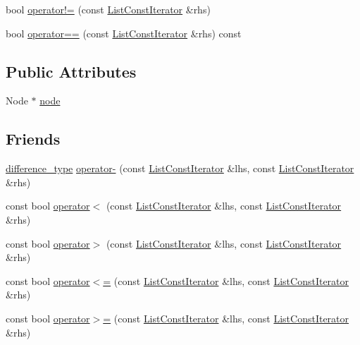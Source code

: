 \begin{DoxyCompactItemize}
\item 
bool \hyperlink{structprism_1_1containers_1_1_list_const_iterator_a16a8c6644cbdedc5173c5a02971379a0}{operator!=} (const \hyperlink{structprism_1_1containers_1_1_list_const_iterator}{List\+Const\+Iterator} \&rhs)
\item 
bool \hyperlink{structprism_1_1containers_1_1_list_const_iterator_a1e424bc437a30ed8895fca8c4dd9934d}{operator==} (const \hyperlink{structprism_1_1containers_1_1_list_const_iterator}{List\+Const\+Iterator} \&rhs) const 
\end{DoxyCompactItemize}
\subsection*{Public Attributes}
\begin{DoxyCompactItemize}
\item 
Node $\ast$ \hyperlink{structprism_1_1containers_1_1_list_const_iterator_ab430437e0a8fb4c69e208a2033c3ac3d}{node}
\end{DoxyCompactItemize}
\subsection*{Friends}
\begin{DoxyCompactItemize}
\item 
\hyperlink{structprism_1_1containers_1_1_list_const_iterator_a64a29291c0139f4087a7c79690ed1e9e}{difference\+\_\+type} \hyperlink{structprism_1_1containers_1_1_list_const_iterator_af2aaffc284b1e7cfc6cd27ca7f6a04cb}{operator-\/} (const \hyperlink{structprism_1_1containers_1_1_list_const_iterator}{List\+Const\+Iterator} \&lhs, const \hyperlink{structprism_1_1containers_1_1_list_const_iterator}{List\+Const\+Iterator} \&rhs)
\item 
const bool \hyperlink{structprism_1_1containers_1_1_list_const_iterator_a06e7f8ea77c503503dca203a503a7c6d}{operator$<$} (const \hyperlink{structprism_1_1containers_1_1_list_const_iterator}{List\+Const\+Iterator} \&lhs, const \hyperlink{structprism_1_1containers_1_1_list_const_iterator}{List\+Const\+Iterator} \&rhs)
\item 
const bool \hyperlink{structprism_1_1containers_1_1_list_const_iterator_a3743f555c1c2f03a44ac2833f7ecaf54}{operator$>$} (const \hyperlink{structprism_1_1containers_1_1_list_const_iterator}{List\+Const\+Iterator} \&lhs, const \hyperlink{structprism_1_1containers_1_1_list_const_iterator}{List\+Const\+Iterator} \&rhs)
\item 
const bool \hyperlink{structprism_1_1containers_1_1_list_const_iterator_a853099a440737dfdd77b683e5f5e27bd}{operator$<$=} (const \hyperlink{structprism_1_1containers_1_1_list_const_iterator}{List\+Const\+Iterator} \&lhs, const \hyperlink{structprism_1_1containers_1_1_list_const_iterator}{List\+Const\+Iterator} \&rhs)
\item 
const bool \hyperlink{structprism_1_1containers_1_1_list_const_iterator_ad7f9f76ffafeb4f4893edd8ff4e6ddcf}{operator$>$=} (const \hyperlink{structprism_1_1containers_1_1_list_const_iterator}{List\+Const\+Iterator} \&lhs, const \hyperlink{structprism_1_1containers_1_1_list_const_iterator}{List\+Const\+Iterator} \&rhs)
\end{DoxyCompactItemize}


